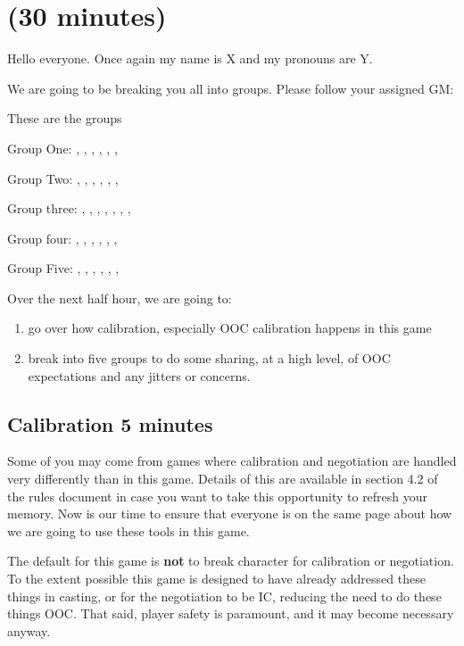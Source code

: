 \documentclass[green]{GL2020}
\begin{document}
\name{\gCalibrationWS{}}

\section*{(30 minutes)}


Hello everyone.  Once again my name is X and my pronouns are Y.  

We are going to be breaking you all into groups.  Please follow your assigned GM:

These are the groups

Group One: 
\cPrince{}, \cPirate{}, \cFlowPriest{}, \cCurse{}, \cChupLeader{}, \cAdopted{}, \cMusic{}

Group Two: 
\cLibAssist{}, \cEvil{}, \cHistory{}, \cChupSecond{}, \cAntiChup{}, \cScholarship{}, \cChupInventor{}

Group three: 
\cBeetle{}, \cEthics{}, \cJuniorStatesman{}, \cInterpol{}, \cLibrarian{}, \cChupAvenger{}, \cHeadScientist{}, \cAssistantScientist{}

Group four: 
\cDiplomat{}, \cHeir{}, \cAmbition{}, \cChupStudent{}, \cPresident{}, \cBunker{}, \cInitiate{}

Group Five: 
\cTechStar{}, \cPirateChild{}, \cDisney{}, \cWildCard{}, \cWarlordDaughter{}, \cHedonist{}, \cEbbPriest{}

Over the next half hour, we are going to:
\begin{enumerate}
	\item go over how calibration, especially OOC calibration happens in this game
	\item break into five groups to do some sharing, at a high level, of OOC expectations 
and any jitters or concerns. 
\end{enumerate}


\subsection*{Calibration {5 minutes}}

Some of you may come from games where calibration and negotiation are handled very differently than in this game. Details of this are available in section 4.2 of the rules document in case you want to take this opportunity to refresh your memory. Now is our time to ensure that everyone is on the same page about how we are going to use these tools in this game.

The default for this game is \textbf{not} to break character for calibration or negotiation. To the extent possible this game is designed to have already addressed these things in casting, or for the negotiation to be IC, reducing the need to do these things OOC. That said, player safety is paramount, and it may become necessary anyway.
\end{document}
